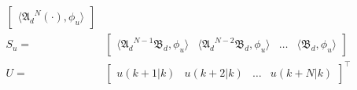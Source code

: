 \begin{equation}
\begin{aligned}
\begin{bmatrix}
            \langle {\mathfrak{A}_d}^{N} (\cdot), {\phi_u} \rangle
        \end{bmatrix} \\
        S_u = &\begin{bmatrix}
            \langle {\mathfrak{A}_d}^{N-1} \mathfrak{B}_d, {\phi_u} \rangle & 
            \langle {\mathfrak{A}_d}^{N-2} \mathfrak{B}_d, {\phi_u} \rangle &
            \hdots &
            \langle \mathfrak{B}_d, {\phi_u} \rangle
        \end{bmatrix} \\
        U = &\begin{bmatrix}
            u(k+1|k) & u(k+2|k) & \hdots & u(k+N|k)
        \end{bmatrix}^\top
    \end{aligned}
\end{equation}